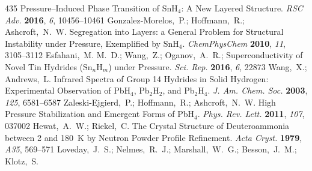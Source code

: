 \documentclass[12pt,letterpaper,oneside]{article}
\begin{document}
\begin{mcitethebibliography}{435}
  Pressure--Induced Phase Transition of SnH$_{4}$: A New Layered Structure.
  \emph{RSC Adv.} \textbf{2016}, \emph{6}, 10456--10461\relax
\mciteBstWouldAddEndPuncttrue
\mciteSetBstMidEndSepPunct{\mcitedefaultmidpunct}
{\mcitedefaultendpunct}{\mcitedefaultseppunct}\relax
\EndOfBibitem
{}
Gonzalez-Morelos,~P.; Hoffmann,~R.; Ashcroft,~N.~W. Segregation into Layers: a
  General Problem for Structural Instability under Pressure, Exemplified by
  SnH$_4$. \emph{ChemPhysChem} \textbf{2010}, \emph{11}, 3105--3112\relax
\mciteBstWouldAddEndPuncttrue
\mciteSetBstMidEndSepPunct{\mcitedefaultmidpunct}
{\mcitedefaultendpunct}{\mcitedefaultseppunct}\relax
\EndOfBibitem
{}
Esfahani,~M. M.~D.; Wang,~Z.; Oganov,~A.~R.; 
  Superconductivity of Novel Tin Hydrides (Sn$_n$H$_m$) under Pressure.
  \emph{Sci. Rep.} \textbf{2016}, \emph{6}, 22873\relax
\mciteBstWouldAddEndPuncttrue
\mciteSetBstMidEndSepPunct{\mcitedefaultmidpunct}
{\mcitedefaultendpunct}{\mcitedefaultseppunct}\relax
\EndOfBibitem
{}
Wang,~X.; Andrews,~L. Infrared Spectra of Group 14 Hydrides in Solid Hydrogen:
  Experimental Observation of PbH$_4$, Pb$_2$H$_2$, and Pb$_2$H$_4$. \emph{J.
  Am. Chem. Soc.} \textbf{2003}, \emph{125}, 6581--6587\relax
\mciteBstWouldAddEndPuncttrue
\mciteSetBstMidEndSepPunct{\mcitedefaultmidpunct}
{\mcitedefaultendpunct}{\mcitedefaultseppunct}\relax
\EndOfBibitem
{}
Zaleski-Ejgierd,~P.; Hoffmann,~R.; Ashcroft,~N.~W. High Pressure Stabilization
  and Emergent Forms of PbH$_4$. \emph{Phys. Rev. Lett.} \textbf{2011},
  \emph{107}, 037002\relax
\mciteBstWouldAddEndPuncttrue
\mciteSetBstMidEndSepPunct{\mcitedefaultmidpunct}
{\mcitedefaultendpunct}{\mcitedefaultseppunct}\relax
\EndOfBibitem
{}
Hewat,~A.~W.; Riekel,~C. The Crystal Structure of Deuteroammonia between 2 and
  180~K by Neutron Powder Profile Refinement. \emph{Acta Cryst.} \textbf{1979},
  \emph{A35}, 569--571\relax
\mciteBstWouldAddEndPuncttrue
\mciteSetBstMidEndSepPunct{\mcitedefaultmidpunct}
{\mcitedefaultendpunct}{\mcitedefaultseppunct}\relax
\EndOfBibitem
{}
Loveday,~J.~S.; Nelmes,~R.~J.; Marshall,~W.~G.; Besson,~J.~M.; Klotz,~S.

\end{mcitethebibliography}
\end{document}
